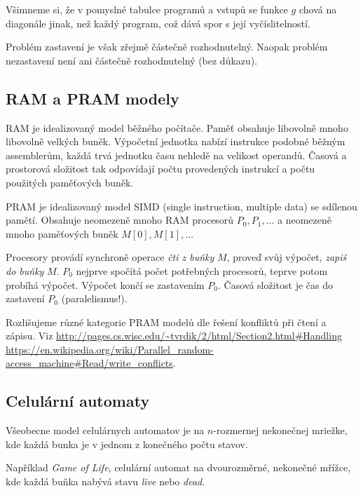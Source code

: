 Všimneme si, že v pomyslné tabulce programů a vstupů se funkce $g$ chová
na diagonále jinak, než každý program, což dává spor s její
vyčíslitelností.

Problém zastavení je však zřejmě částečně rozhodnutelný.
Naopak problém nezastavení není ani částečně rozhodnutelný (bez důkazu).

\subsection{RAM a PRAM modely}


RAM je idealizovaný model běžného počítače. Paměť obsahuje libovolně
mnoho libovolně velkých buněk. Výpočetní jednotka nabízí
instrukce podobné běžným assemblerům, každá trvá jednotku času nehledě
na velikost operandů. Časová a prostorová složitost tak odpovídají počtu
provedených instrukcí a počtu použitých paměťových buněk.

PRAM je idealizovaný model SIMD (single instruction, multiple data) se
sdílenou pamětí. Obsahuje
neomezeně mnoho RAM procesorů $P_0, P_1,\ldots$
a neomezeně mnoho paměťových buněk $M[0], M[1],\ldots$

Procesory provádí synchroně operace {\em čti z buňky} $M$, proveď svůj
výpočet, {\em zapiš do buňky} $M$.
$P_0$ nejprve spočítá počet potřebných procesorů, teprve potom probíhá
výpočet. Výpočet končí se zastavením $P_0$. Časová složitost je čas
do zastavení $P_0$ (paralelismus!).

Rozlišujeme různé kategorie PRAM modelů dle řešení konfliktů při čtení a
zápisu. Viz
\href{http://pages.cs.wisc.edu/~tvrdik/2/html/Section2.html#Handling}{http://pages.cs.wisc.edu/{\textasciitilde}tvrdik/2/html/Section2.html\#Handling}\\
\href{https://en.wikipedia.org/wiki/Parallel_random-access_machine#Read/write_conflicts}{https://en.wikipedia.org/wiki/Parallel\_random-access\_machine\#Read/write\_conflicts}.

\subsection{Celulární automaty}

Všeobecne model celulárnych automatov je na $n$-rozmernej nekonečnej
mriežke, kde každá bunka je v jednom z konečného počtu stavov.

Například {\em Game of Life}, celulární automat na dvourozměrné, nekonečné
mřížce, kde každá buňka nabývá stavu {\em live} nebo {\em dead}.

